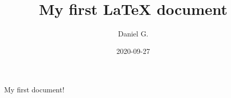 \documentclass{article}  %
\title{My first LaTeX document}
\date{2020-09-27}
\author{Daniel G.}
\begin{document}
  \maketitle  %
  \newpage  %

  My first document!
\end{document}
